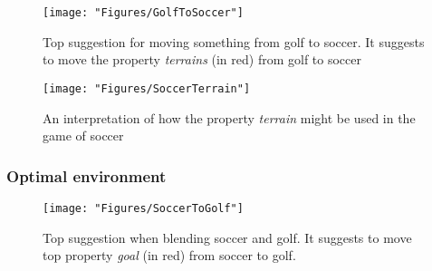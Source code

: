 \begin{figure} \centering \texttt{[image: "Figures/GolfToSoccer"]} \caption[Blending soccer and golf]{Top suggestion for moving something from golf to soccer. It suggests to move the property \emph{terrains} (in red) from golf to soccer} \label{fig:GolfToSoccer} \end{figure}

\begin{figure} \centering \texttt{[image: "Figures/SoccerTerrain"]} \caption[Soccer on terrain]{An interpretation of how the property \emph{terrain} might be used in the game of soccer} \label{fig:SoccerTerrain} \end{figure}


\subsubsection{Optimal environment}
\begin{figure} \centering \texttt{[image: "Figures/SoccerToGolf"]} \caption[Blending soccer and golf]{Top suggestion when blending soccer and golf. It suggests to move top property \emph{goal} (in red) from soccer to golf.} \label{fig:SoccerToGolf} \end{figure}



